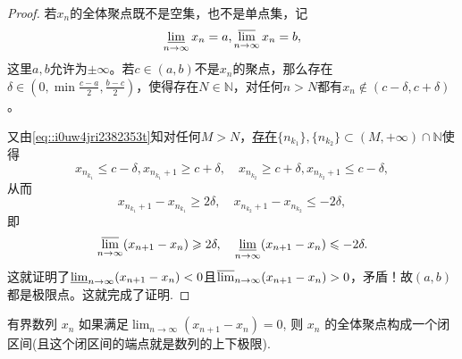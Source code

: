 \documentclass[../../main.tex]{subfiles}%
\begin{document}
\begin{proof}
若\( x_n \)的全体聚点既不是空集，也不是单点集，记
\begin{align}
\varliminf_{n \to \infty} x_n = a, \varlimsup_{n \to \infty} x_n = b, \label{eq::i0uw4jri2382353t}
\end{align}
这里\( a,b \)允许为\( \pm \infty \)。若\( c \in (a,b) \)不是\( x_n \)的聚点，那么存在\( \delta \in (0,\min{\frac{c-a}{2},\frac{b-c}{2}}) \)，使得存在\( N \in \mathbb{N} \)，对任何\( n > N \)都有\( x_n \notin (c - \delta, c + \delta) \)。

又由\eqref{eq::i0uw4jri2382353t}知对任何\( M > N \)，\hyperlink{n1n2子列存在的原因}{存在\( \{n_{k_1}\}, \{n_{k_2}\} \subset (M,+\infty)\cap \mathbb{N} \)}使得
\[
x_{n_{k_1}} \leqslant c - \delta, x_{n_{k_1} + 1} \geqslant c + \delta,\quad x_{n_{k_2}} \geqslant c + \delta, x_{n_{k_2} + 1} \leqslant c - \delta,
\]
从而
\[
x_{n_{k_1} + 1} - x_{n_{k_1}} \geqslant 2\delta,\quad  x_{n_{k_2} + 1} - x_{n_{k_2}} \leqslant -2\delta,
\]
即
\[
\varlimsup_{n \to \infty} (x_{n+1} - x_n) \geqslant 2\delta, \quad  \varliminf_{n \to \infty} (x_{n+1} - x_n) \leqslant -2\delta.
\]
这就证明了\( \varliminf_{n \to \infty} (x_{n+1} - x_n) < 0 \)且\( \varlimsup_{n \to \infty} (x_{n+1} - x_n) > 0 \)，矛盾！故\( (a,b) \)都是极限点。这就完成了证明.
\end{proof}

\begin{corollary}\label{corollary:有界数列差分极限为0则其闭包一定是闭区间}
有界数列 \( x_n \) 如果满足$\lim_{n \to \infty} (x_{n+1} - x_n) = 0$,
则 \( x_n \) 的全体聚点构成一个闭区间(且这个闭区间的端点就是数列的上下极限).
\end{corollary}
\end{document}
